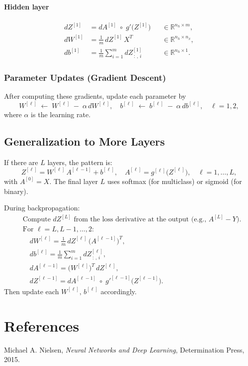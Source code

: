 \documentclass{article}
\begin{document}
\paragraph{Hidden layer}
\begin{align}
  dZ^{[1]} &= dA^{[1]} \;\circ\; g'\bigl(Z^{[1]}\bigr)
            &&\in\mathbb{R}^{n_h\times m}, \label{eq:hid1}\\
  dW^{[1]} &= \frac{1}{m}\,dZ^{[1]}\,X^{T} 
            &&\in\mathbb{R}^{n_h\times n_x}, \label{eq:hid2}\\
  db^{[1]} &= \frac{1}{m}\sum_{i=1}^m dZ^{[1]}_{\,:\,,\,i} 
            &&\in\mathbb{R}^{n_h\times 1}. \label{eq:hid3}
\end{align}

\subsubsection{Parameter Updates (Gradient Descent)}

After computing these gradients, update each parameter by
\[
  W^{[\ell]} \;\leftarrow\; W^{[\ell]} \;-\; \alpha\,dW^{[\ell]},
  \quad
  b^{[\ell]} \;\leftarrow\; b^{[\ell]} \;-\; \alpha\,db^{[\ell]},
  \quad \ell = 1,2,
\]
where $\alpha$ is the learning rate.

\bigskip
\subsection{Generalization to More Layers}

If there are $L$ layers, the pattern is:
\[
  Z^{[\ell]} = W^{[\ell]}\,A^{[\ell-1]} + b^{[\ell]}, 
  \quad
  A^{[\ell]} = g^{[\ell]}\bigl(Z^{[\ell]}\bigr), 
  \quad  \ell = 1,\dots,L,
\]
with $A^{[0]} = X$.  The final layer $L$ uses softmax (for multiclass) or sigmoid (for binary).  

During backpropagation:
\begin{align*}
  &\text{Compute } dZ^{[L]} \text{ from the loss derivative at the output (e.g., }A^{[L]} - Y\text{).}\\
  &\text{For } \ell = L, L-1, \dots, 2: \\
  &\quad dW^{[\ell]} = \frac{1}{m}\,dZ^{[\ell]}\,\bigl(A^{[\ell-1]}\bigr)^{T},\\
  &\quad db^{[\ell]} = \frac{1}{m}\sum_{i=1}^m dZ^{[\ell]}_{\,:\,,\,i},\\
  &\quad dA^{[\ell-1]} = \bigl(W^{[\ell]}\bigr)^{T}\,dZ^{[\ell]},\\
  &\quad dZ^{[\ell-1]} = dA^{[\ell-1]} \;\circ\; g'^{[\ell-1]}\bigl(Z^{[\ell-1]}\bigr).
\end{align*}
Then update each $W^{[\ell]},\,b^{[\ell]}$ accordingly.

\bigskip
\section*{References}

\noindent Michael A. Nielsen, \textit{Neural Networks and Deep Learning}, Determination Press, 2015.
\end{document}
